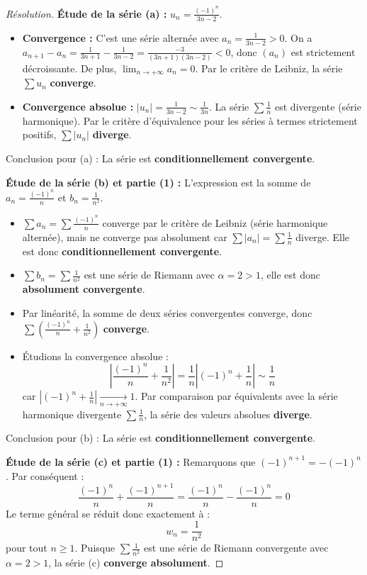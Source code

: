 \documentclass[12pt,a4paper]{report}
\begin{document}
\begin{proof}[Résolution]
\textbf{Étude de la série (a) :} $u_n = \frac{(-1)^n}{3n-2}$.
\begin{itemize}
    \item \textbf{Convergence :} C'est une série alternée avec $a_n = \frac{1}{3n-2} > 0$.
    On a $a_{n+1} - a_n = \frac{1}{3n+1} - \frac{1}{3n-2} = \frac{-3}{(3n+1)(3n-2)} < 0$, donc $(a_n)$ est strictement décroissante.
    De plus, $\lim_{n \to +\infty} a_n = 0$.
    Par le critère de Leibniz, la série $\sum u_n$ \textbf{converge}.
    \item \textbf{Convergence absolue :}
    $|u_n| = \frac{1}{3n-2} \sim \frac{1}{3n}$.
    La série $\sum \frac{1}{n}$ est divergente (série harmonique). Par le critère d'équivalence pour les séries à termes strictement positifs, $\sum |u_n|$ \textbf{diverge}.
\end{itemize}
Conclusion pour (a) : La série est \textbf{conditionnellement convergente}.

\textbf{Étude de la série (b) et partie (1) :}
L'expression est la somme de $a_n = \frac{(-1)^n}{n}$ et $b_n = \frac{1}{n^2}$.
\begin{itemize}
    \item $\sum a_n = \sum \frac{(-1)^n}{n}$ converge par le critère de Leibniz (série harmonique alternée), mais ne converge pas absolument car $\sum |a_n| = \sum \frac{1}{n}$ diverge. Elle est donc \textbf{conditionnellement convergente}.
    \item $\sum b_n = \sum \frac{1}{n^2}$ est une série de Riemann avec $\alpha = 2 > 1$, elle est donc \textbf{absolument convergente}.
    \item Par linéarité, la somme de deux séries convergentes converge, donc $\sum \left( \frac{(-1)^n}{n} + \frac{1}{n^2} \right)$ \textbf{converge}.
    \item Étudions la convergence absolue :
    \[ \left| \frac{(-1)^n}{n} + \frac{1}{n^2} \right| = \frac{1}{n} \left| (-1)^n + \frac{1}{n} \right| \sim \frac{1}{n} \]
    car $\left| (-1)^n + \frac{1}{n} \right| \xrightarrow[n \to +\infty]{} 1$.
    Par comparaison par équivalents avec la série harmonique divergente $\sum \frac{1}{n}$, la série des valeurs absolues \textbf{diverge}.
\end{itemize}
Conclusion pour (b) : La série est \textbf{conditionnellement convergente}.

\textbf{Étude de la série (c) et partie (1) :}
Remarquons que $(-1)^{n+1} = -(-1)^n$. Par conséquent :
\[ \frac{(-1)^n}{n} + \frac{(-1)^{n+1}}{n} = \frac{(-1)^n}{n} - \frac{(-1)^n}{n} = 0 \]
Le terme général se réduit donc exactement à :
\[ w_n = \frac{1}{n^2} \]
pour tout $n \ge 1$.
Puisque $\sum \frac{1}{n^2}$ est une série de Riemann convergente avec $\alpha = 2 > 1$, la série (c) \textbf{converge absolument}.


\end{proof}
\end{document}
